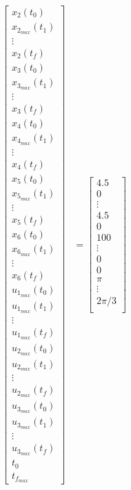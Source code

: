 \documentclass[11pt,usenames]{article}
\begin{document}
\begin{align}
\begin{bmatrix}
	x_{2}(t_{0}) \\ x_{2_{max}}(t_{1}) \\ \vdots \\  x_{2}(t_{f}) \\ 
	x_{3}(t_{0}) \\ x_{3_{max}}(t_{1}) \\ \vdots \\  x_{3}(t_{f}) \\ 
	x_{4}(t_{0}) \\ x_{4_{max}}(t_{1}) \\ \vdots \\  x_{4}(t_{f}) \\
	x_{5}(t_{0}) \\ x_{5_{max}}(t_{1}) \\ \vdots \\  x_{5}(t_{f}) \\ 
	x_{6}(t_{0}) \\ x_{6_{max}}(t_{1}) \\ \vdots \\  x_{6}(t_{f}) \\ 
	u_{1_{max}}(t_{0}) \\ u_{1_{max}}(t_{1}) \\ \vdots \\  u_{1_{max}}(t_{f}) \\
	u_{2_{max}}(t_{0}) \\ u_{2_{max}}(t_{1}) \\ \vdots \\  u_{2_{max}}(t_{f}) \\ 
	u_{3_{max}}(t_{0}) \\ u_{3_{max}}(t_{1}) \\ \vdots \\  u_{3_{max}}(t_{f}) \\  
	t_{0} \\ 
	t_{f_{max}}  
	\end{bmatrix}
	&=
	\begin{bmatrix}
	4.5 \\ 0 \\ \vdots \\  4.5 \\  
	0 \\ 100 \\ \vdots \\  0 \\ 
	0 \\ \pi \\ \vdots \\  2\pi /3 \\ 

\end{bmatrix}
\end{align}
\end{document}
